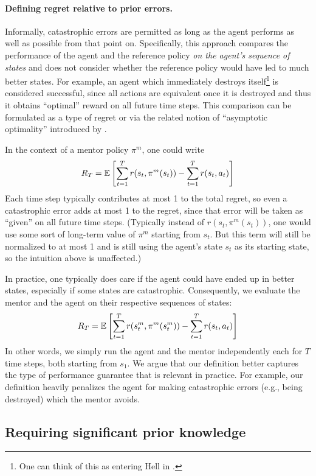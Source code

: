 \paragraph{Defining regret relative to prior errors.} Informally, catastrophic errors are permitted as long as the agent performs as well as possible from that point on. Specifically, this approach compares the performance of the agent and the reference policy \emph{on the agent's sequence of states} and does not consider whether the reference policy would have led to much better states. For example, an agent which immediately destroys itself\footnote{One can think of this as entering Hell in .} is considered successful, since all actions are equivalent once it is destroyed and thus it obtains ``optimal'' reward on all future time steps. This comparison can be formulated as a type of regret \citet{he2021nearly, liu_regret_2021} or via the related notion of ``asymptotic optimality'' introduced by \citet{lattimore_asymptotically_2011}. 

In the context of a mentor policy $\pi^m$, one could write
\[
R_T= \operatorname*{\mathbb{E}}\left[\sum_{t=1}^T r(s_t, \pi^m(s_t) )- \sum_{t=1}^T r(s_t, a_t)\right]
\]
Each time step typically contributes at most 1 to the total regret, so even a catastrophic error adds at most 1 to the regret, since that error will be taken as ``given'' on all future time steps. (Typically instead of $r(s_t, \pi^m(s_t))$, one would use some sort of long-term value of $\pi^m$ starting from $s_t$. But this term will still be normalized to at most 1 and is still using the agent's state $s_t$ as its starting state, so the intuition above is unaffected.) 

In practice, one typically does care if the agent could have ended up in better states, especially if some states are catastrophic. Consequently, we evaluate the mentor and the agent on their respective sequences of states:
\[
R_T = \operatorname*{\mathbb{E}}\left[\sum_{t=1}^T r(s_t^m, \pi^m(s_t^m) )- \sum_{t=1}^T r(s_t, a_t)\right]
\]
In other words, we simply run the agent and the mentor independently each for $T$ time steps, both starting from $s_1$. We argue that our definition better captures the type of performance guarantee that is relevant in practice. For example, our definition heavily penalizes the agent for making catastrophic errors (e.g., being destroyed) which the mentor avoids.



\subsection{Requiring significant prior knowledge}

